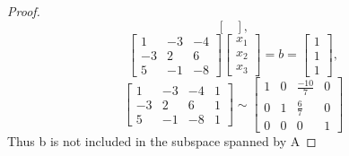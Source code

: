 \documentclass[12pt,a4paper]{article}
\begin{document}
\begin{proof}
\[\begin{bmatrix}
      \end{bmatrix},
      \]
      \[
    \begin{bmatrix}
      1 & -3 & -4 \\
      -3 & 2 & 6 \\
      5 & -1 & -8
    \end{bmatrix}
    \begin{bmatrix}
        x_1\\x_2\\x_3
      \end{bmatrix}=
      b=\begin{bmatrix}
        1\\1\\1
      \end{bmatrix},
    \]
    \[
    \begin{bmatrix}
      1 & -3 & -4 &1\\
      -3 & 2 & 6 &1\\
      5 & -1 & -8 &1
  \end{bmatrix} \sim
  \begin{bmatrix}
    1 & 0 & \frac{-10}{7} & 0 \\
    0 & 1 & \frac{6}{7}& 0 \\
    0 & 0 & 0& 1
  \end{bmatrix}
    \]
    Thus b is not included in the subspace spanned by A
\end{proof}
\end{document}
